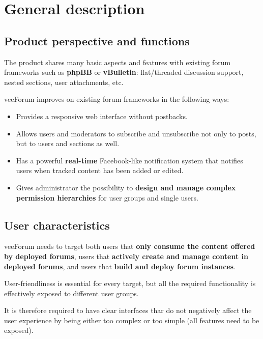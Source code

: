 \documentclass[12pt]{report}
\renewcommand\emph{\textbf}
\begin{document}
            \section{General description}
                \subsection{Product perspective and functions}
                    The product shares many basic aspects and features with existing forum frameworks such as \emph{phpBB} or \emph{vBulletin}: flat/threaded discussion support, nested sections, user attachments, etc.

                    veeForum improves on existing forum frameworks in the following ways:

                    \begin{itemize}
                        \item Provides a responsive web interface without postbacks.
                        \item Allows users and moderators to subscribe and unsubscribe not only to posts, but to users and sections as well.
                        \item Has a powerful \emph{real-time} Facebook-like notification system that notifies users when tracked content has been added or edited.
                        \item Gives administrator the possibility to \emph{design and manage complex permission hierarchies} for user groups and single users.
                    \end{itemize}

                \subsection{User characteristics}
                    veeForum needs to target both users that \emph{only consume the content offered by deployed forums}, users that \emph{actively create and manage content in deployed forums}, and users that \emph{build and deploy forum instances}.

                    User-friendliness is essential for every target, but all the required functionality is effectively exposed to different user groups.

                    It is therefore required to have clear interfaces thar do not negatively affect the user experience by being either too complex or too simple (all features need to be exposed).
\end{document}
